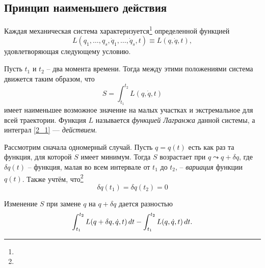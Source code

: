 \subsection{Принцип наименьшего действия}

\begin{to_thr}
     Каждая механическая система характеризуется\footnote{
     } определенной функцией
     $$
         L(q_1, \ldots, q_s, \dot q_1, \ldots, \dot q_s, t) \equiv L(q, \dot q, t),
     $$
     удовлетворяющая следующему условию.

     Пусть $t_1$ и $t_2$ -- два момента времени. Тогда между этими положениями система движется таким образом, что 
     \begin{equation}
     \label{2_1}
         S = \int_{t_1}^{t_2} L(q, \dot q, t) 
     \end{equation}
     имеет наименьшее возможное значение на малых участках и экстремальное для всей траектории. Функция $L$ называется \textit{функцией Лагранжа} данной системы, а интеграл \eqref{2_1} --- \textit{действием}.
\end{to_thr}


Рассмотрим сначала одномерный случай. Пусть $q = q(t)$ есть как раз та функция, для которой $S$ имеет минимум. Тогда $S$ возрастает при $q \leadsto q + \delta q$, где $\delta q (t)$ -- функция, малая во всем интервале от $t_1$ до $t_2$, -- \textit{вариация} функции $q(t)$. Также учтём, что\footnote{
}
\begin{equation}
    \label{2_3}
    \delta q(t_1) = \delta q(t_2) = 0
\end{equation}

Изменение $S$ при замене $q$ на $q+\delta q$ дается разностью
$$
    \int_{t_1}^{t_2} L(q + \delta q, \dot{q}, t) \, d t - \int_{t_1}^{t_2} L(q, \dot{q}, t) \, d t.
$$

